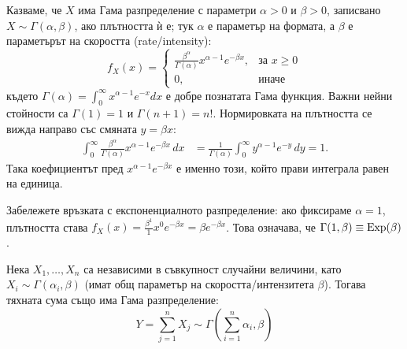 Казваме, че $X$ има Гама разпределение с параметри $\alpha > 0$ и $\beta > 0$, записвано $X \sim \Gamma(\alpha, \beta)$, ако плътността ѝ е; тук $\alpha$ е параметър на формата, а $\beta$ е параметърът на скоростта (rate/intensity):
\[
f_X(x) =
\begin{cases}
\frac{\beta^\alpha}{\Gamma(\alpha)} x^{\alpha - 1} e^{-\beta x}, & \text{за } x \ge 0 \\
0, & \text{иначе}
\end{cases}
\]
където $\Gamma(\alpha) = \int_0^\infty x^{\alpha-1} e^{-x} dx$ е добре познатата Гама функция. Важни нейни стойности са $\Gamma(1) = 1$ и $\Gamma(n+1) = n!$.
Нормировката на плътността се вижда направо със смяната $y=\beta x$:
\begin{align*}
\int_0^\infty \frac{\beta^\alpha}{\Gamma(\alpha)}
x^{\alpha-1}e^{-\beta x}\,dx
&=\frac{1}{\Gamma(\alpha)}
\int_0^\infty y^{\alpha-1}e^{-y}\,dy=1.
\end{align*}
Така коефициентът пред $x^{\alpha-1}e^{-\beta x}$ е именно този, който прави интеграла равен на единица.

Забележете връзката с експоненциалното разпределение: ако фиксираме $\alpha = 1$, плътността става $f_X(x) = \frac{\beta^1}{1} x^{0} e^{-\beta x} = \beta e^{-\beta x}$. Това означава, че $\Gamma(1, \beta) \equiv \operatorname{Exp}(\beta)$.

\begin{prop}
Нека $X_1, \dots, X_n$ са независими в съвкупност случайни величини, като $X_i \sim \Gamma(\alpha_i, \beta)$ (имат общ параметър на скоростта/интензитета $\beta$). Тогава тяхната сума също има Гама разпределение:
\[
Y = \sum_{j=1}^n X_j \sim \Gamma\left(\sum_{i=1}^n \alpha_i, \beta\right)
\]
\end{prop}

